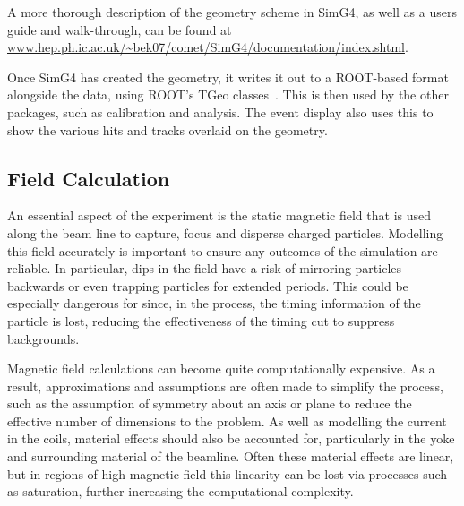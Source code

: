 A more thorough description of the geometry scheme  in SimG4, as well as a users guide and walk-through, can be found at \url{www.hep.ph.ic.ac.uk/~bek07/comet/SimG4/documentation/index.shtml}.

Once SimG4 has created the geometry, it writes it out to a ROOT-based format alongside the data, using ROOT's TGeo classes~\cite{ROOTTGeo}.
This is then used by the other packages, such as calibration and analysis.  
The event display also uses this to show the various hits and tracks overlaid on the geometry.

\subsection{Field Calculation}
\FigSoftwareFieldMap
\FigSoftwareFieldMapComparison

An essential aspect of the \COMET experiment is the static magnetic field that is used along the beam line to capture, focus and disperse charged particles.
Modelling this field accurately is important to ensure any outcomes of the simulation are reliable.
In particular, dips in the field have a risk of mirroring particles backwards or even trapping particles for extended periods.
This could be especially dangerous for \COMET since, in the process, the timing information of the particle is lost, reducing the effectiveness of the timing cut to suppress backgrounds.

Magnetic field calculations can become quite computationally expensive.  
As a result, approximations and assumptions are often made to simplify the process, such as the assumption of symmetry about an axis or plane to reduce the effective number of dimensions to the problem.
As well as modelling the current in the coils, material effects should also be accounted for, particularly in the yoke and surrounding material of the beamline.
Often these material effects are linear, but in regions of high magnetic field this linearity can be lost via processes such as saturation, further increasing the computational complexity.

